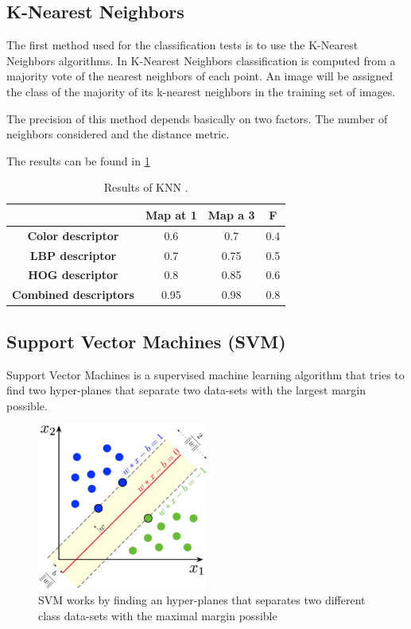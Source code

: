 \documentclass[runningheads]{llncs}
\begin{document}
\subsection{K-Nearest Neighbors}

The first method used for the classification tests is to use the K-Nearest Neighbors algorithms.
In K-Nearest Neighbors classification is computed from a majority vote of the nearest neighbors of each point.
An image will be assigned the class of the majority of its k-nearest neighbors in the training set of images.

The precision of this method depends basically on two factors. The number of neighbors considered and the distance metric.

The results can be found in \ref{KNNResults}

\begin{table}[ht!]
\caption{Results of KNN .}
\begin{center}
\begin{tabular}{ | c | c | c | c | }
\hline
 & \textbf{Map at 1} & \textbf{Map a 3} & \textbf{F} \\ 
 \hline
 \textbf{Color descriptor} & 0.6 & 0.7 & 0.4 \\  
 \hline
 \textbf{LBP descriptor} & 0.7 & 0.75 & 0.5 \\ 
 \hline
 \textbf{HOG descriptor} & 0.8 & 0.85 & 0.6 \\  
 \hline
 \textbf{Combined descriptors} & 0.95 & 0.98 & 0.8 \\  
 \hline
\end{tabular}
\label{KNNResults}
\end{center}
\end{table}

\subsection{Support Vector Machines (SVM)}

Support Vector Machines is a supervised machine learning algorithm that tries to find two hyper-planes that separate two data-sets with the largest margin possible. 

\begin{figure}
  \centering
  \includegraphics[width=0.5\textwidth]{SVM.png}\hfill
  \caption{SVM works by finding an hyper-planes that separates two different class data-sets with the maximal margin possible}
\end{figure}
\end{document}
